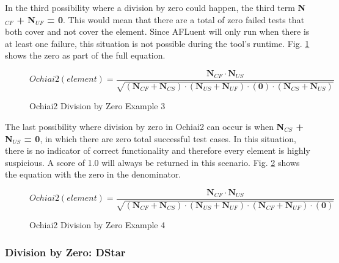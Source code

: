 In the third possibility where a division by zero could happen, the third term
\textbf{N$_{CF}$ + N$_{UF}$ = 0}. This would mean that there are a total of zero
failed tests that both cover and not cover the element. Since AFLuent will only
run when there is at least one failure, this situation is not possible during
the tool's runtime. Fig. \ref{fig:ochiai2_div_by_zero_3} shows the zero as part
of the full equation.

\begin{figure}[!htb]
	\begin{center}
		\begin{equation}
			Ochiai2(element) = \frac{\textbf{N$_{CF}$}\cdot{\textbf{N$_{US}$}}}{\sqrt{(\textbf{N$_{CF}$}  + \textbf{N$_{CS}$}) \cdot (\textbf{N$_{US}$}  + \textbf{N$_{UF}$}) \cdot (\textbf{0}) \cdot (\textbf{N$_{CS}$}  + \textbf{N$_{US}$})}}
		\end{equation}
		\caption{\label{fig:ochiai2_div_by_zero_3} Ochiai2 Division by Zero
		Example 3}
	\end{center}
\end{figure}

The last possibility where division by zero in Ochiai2 can occur is when
\textbf{N$_{CS}$ + N$_{US}$ = 0}, in which there are zero total successful test
cases. In this situation, there is no indicator of correct functionality and
therefore every element is highly suspicious. A score of 1.0 will always be
returned in this scenario. Fig. \ref{fig:ochiai2_div_by_zero_4} shows the
equation with the zero in the denominator.

\begin{figure}[!htb]
	\begin{center}
		\begin{equation}
			Ochiai2(element) = \frac{\textbf{N$_{CF}$}\cdot{\textbf{N$_{US}$}}}{\sqrt{(\textbf{N$_{CF}$}  + \textbf{N$_{CS}$}) \cdot (\textbf{N$_{US}$}  + \textbf{N$_{UF}$}) \cdot (\textbf{N$_{CF}$}  + \textbf{N$_{UF}$}) \cdot (\textbf{0})}}
		\end{equation}
		\caption{\label{fig:ochiai2_div_by_zero_4} Ochiai2 Division by Zero
		Example 4}
	\end{center}
\end{figure}

\subsubsection{Division by Zero: DStar}
\label{subsubsec:div_by_zero_dstar}

